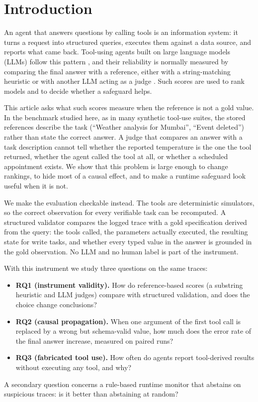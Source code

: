 \documentclass[pdflatex,sn-mathphys-num,Numbered]{sn-jnl}
\begin{document}
\section{Introduction}\label{sec:intro}

An agent that answers questions by calling tools is an information system: it turns a request into structured queries, executes them against a data source, and reports what came back. Tool-using agents built on large language models (LLMs) follow this pattern \cite{yao2023react,schick2023toolformer}, and their reliability is normally measured by comparing the final answer with a reference, either with a string-matching heuristic or with another LLM acting as a judge \cite{zheng2023judging,gu2024surveyjudge}. Such scores are used to rank models and to decide whether a safeguard helps.

This article asks what such scores measure when the reference is not a gold value. In the benchmark studied here, as in many synthetic tool-use suites, the stored references describe the task (``Weather analysis for Mumbai'', ``Event deleted'') rather than state the correct answer. A judge that compares an answer with a task description cannot tell whether the reported temperature is the one the tool returned, whether the agent called the tool at all, or whether a scheduled appointment exists. We show that this problem is large enough to change rankings, to hide most of a causal effect, and to make a runtime safeguard look useful when it is not.

We make the evaluation checkable instead. The tools are deterministic simulators, so the correct observation for every verifiable task can be recomputed. A structured validator compares the logged trace with a gold specification derived from the query: the tools called, the parameters actually executed, the resulting state for write tasks, and whether every typed value in the answer is grounded in the gold observation. No LLM and no human label is part of the instrument.

With this instrument we study three questions on the same traces:
\begin{itemize}
\item \textbf{RQ1 (instrument validity).} How do reference-based scores (a substring heuristic and LLM judges) compare with structured validation, and does the choice change conclusions?
\item \textbf{RQ2 (causal propagation).} When one argument of the first tool call is replaced by a wrong but schema-valid value, how much does the error rate of the final answer increase, measured on paired runs?
\item \textbf{RQ3 (fabricated tool use).} How often do agents report tool-derived results without executing any tool, and why?
\end{itemize}
A secondary question concerns a rule-based runtime monitor that abstains on suspicious traces: is it better than abstaining at random?
\end{document}
